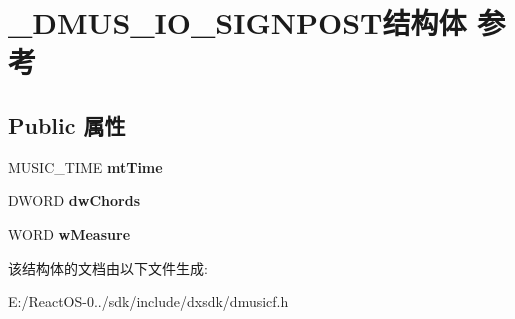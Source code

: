 \hypertarget{struct___d_m_u_s___i_o___s_i_g_n_p_o_s_t}{}\section{\+\_\+\+D\+M\+U\+S\+\_\+\+I\+O\+\_\+\+S\+I\+G\+N\+P\+O\+S\+T结构体 参考}
\label{struct___d_m_u_s___i_o___s_i_g_n_p_o_s_t}
\subsection*{Public 属性}
\begin{DoxyCompactItemize}
\item 
\mbox{\label{struct___d_m_u_s___i_o___s_i_g_n_p_o_s_t_a13c26b057e272b797369df69c9cc26ed}} 
M\+U\+S\+I\+C\+\_\+\+T\+I\+ME {\bfseries mt\+Time}
\item 
\mbox{\label{struct___d_m_u_s___i_o___s_i_g_n_p_o_s_t_a2aea58591cb159c15196c5623c74ebf6}} 
D\+W\+O\+RD {\bfseries dw\+Chords}
\item 
\mbox{\label{struct___d_m_u_s___i_o___s_i_g_n_p_o_s_t_ac0879365bdcf8d5c1a6720dc257ef049}} 
W\+O\+RD {\bfseries w\+Measure}
\end{DoxyCompactItemize}


该结构体的文档由以下文件生成\+:\begin{DoxyCompactItemize}
\item 
E\+:/\+React\+O\+S-\/0../sdk/include/dxsdk/dmusicf.\+h\end{DoxyCompactItemize}
